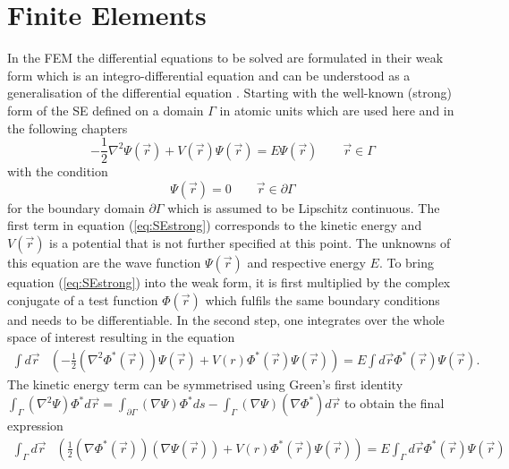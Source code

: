 {\section{Finite Elements}
\label{ch:introFEM}
In the FEM the differential equations to be solved are formulated in their weak form which is an integro-differential equation and can be understood as a generalisation of the differential equation \cite{femBraess}.
Starting with the well-known (strong) form of the SE defined on a domain $ \Gamma$ in atomic units which are used here and in the following chapters
\begin{equation} \label{eq:SEstrong}
-\frac 12 \nabla^2\Psi(\vec{r})+ V(\vec{r})\Psi(\vec{r})=E \Psi(\vec{r}) \qquad  \vec{r}\in \Gamma
\end{equation}
with the condition 
\begin{equation}
    \Psi(\vec{r})=0  \qquad \vec{r} \in \partial \Gamma
\end{equation}
for the boundary domain $\partial \Gamma$ which is assumed to be Lipschitz continuous.
The first term in equation (\ref{eq:SEstrong}) corresponds to the kinetic energy and $V(\vec{r})$ is a potential that is not further specified at this point.
The unknowns of this equation are the wave function $\Psi(\vec{r})$ and respective energy $E$.
To bring equation (\ref{eq:SEstrong}) into the weak form, it is first multiplied by the complex conjugate of a test function $\Phi(\vec{r})$ which fulfils the same boundary conditions and needs to be differentiable.
In the second step, one integrates over the whole space of interest resulting in the equation
\begin{align}
\int d \vec{r} & \left( - \frac 12 \left(\nabla^2\Phi^*(\vec{r})\right)\Psi(\vec{r})
               + V(r) \Phi^*(\vec{r}) \Psi(\vec{r})\right) = E \int d \vec{r} \Phi^*(\vec{r}) \Psi(\vec{r}).
\end{align}
The kinetic energy term can be symmetrised using Green's first identity $\int_\Gamma (\nabla^2\Psi)\Phi^* d\vec{r}=\int_{\partial \Gamma} (\nabla\Psi)\Phi^* ds -\int_\Gamma (\nabla\Psi)(\nabla\Phi^*) d\vec{r}$ to obtain the final expression
\begin{align}\label{eq:SEweak}
\int_\Gamma d \vec{r} & \left(  \frac 12 \left(\nabla\Phi^*(\vec{r})\right) \left(\nabla\Psi(\vec{r})\right) 
               + V(r) \Phi^*(\vec{r}) \Psi(\vec{r})\right) = E \int_\Gamma d \vec{r} \Phi^*(\vec{r}) \Psi(\vec{r})\\

\end{align}}
